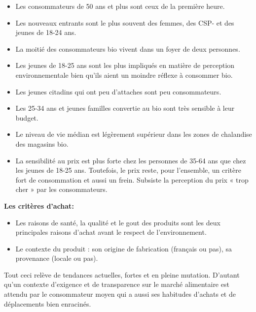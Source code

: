 \documentclass[12pt,a4paper]{report}
\begin{document}
	\begin{itemize}
	\item Les consommateurs de 50 ans et plus  sont ceux de la première heure.
	
	\item Les nouveaux entrants sont le plus souvent des femmes, des CSP- et des jeunes de 18-24 ans.
	
	\item La moitié des consommateurs bio vivent dans un foyer de deux personnes.
	
	\item Les jeunes de 18-25 ans sont les plus impliqués en matière de perception environnementale bien qu’ils aient un moindre réflexe à consommer bio.
	
	\item Les jeunes citadins qui ont peu d’attaches sont peu consommateurs.
	
	\item Les 25-34 ans et jeunes familles convertie au bio sont très sensible à leur budget.
	
	\item Le niveau de vie médian est légèrement supérieur dans les zones de chalandise des magasins bio.
	
	\item La sensibilité au prix est plus forte chez les personnes de 35-64 ans que chez les jeunes de 18-25 ans. Toutefois, le prix reste, pour l’ensemble, un critère fort de consommation et aussi un frein. Subsiste la perception du prix « trop cher » par les consommateurs. \\
	\end{itemize}

\textbf{Les critères d'achat:}\\
	
	\begin{itemize}
		\item Les raisons de santé, la qualité et le gout des produits sont les deux principales raisons d’achat avant le respect de l’environnement.  
		\item  Le contexte du produit : son origine de fabrication (français ou pas), sa provenance (locale ou pas). \\
	
	\end{itemize}

	Tout ceci relève de tendances actuelles, fortes et en pleine mutation. D’autant qu’un contexte d’exigence et de transparence sur le marché alimentaire est attendu par le consommateur moyen qui a aussi ses habitudes d’achats et de déplacements bien enracinés. 
	
\end{document}
